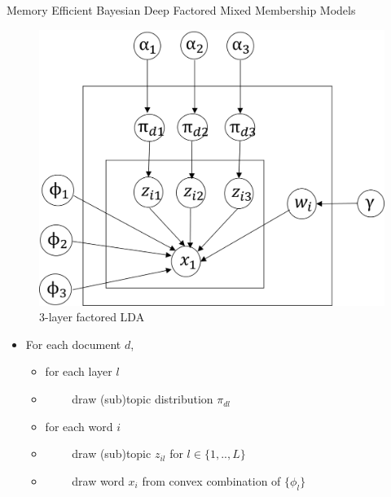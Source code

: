 \documentclass[mathserif, handout]{beamer}
\begin{document}
\begin{frame}{Memory Efficient Bayesian Deep Factored Mixed Membership Models}
\begin{figure}
  \begin{center}
  \includegraphics[scale=0.17]{lda.png}
  \caption{3-layer factored LDA}
  \label{fig:distributed}
  \end{center}
\end{figure}

\begin{itemize}
\item[] For each document $d$,
    \begin{itemize}
        \item[] for each layer $l$
        \item[] ~~~~ draw (sub)topic distribution $\pi_{dl}$
    \end{itemize}
    \begin{itemize}
        \item[] for each word $i$
        \item[] ~~~~ draw (sub)topic $z_{il}$ for $l\in \{1,..,L\}$
        \item[] ~~~~ draw word $x_i$ from convex combination of $\{\phi_l\}$
        \end{itemize}
\end{itemize}


\end{frame}
\end{document}
